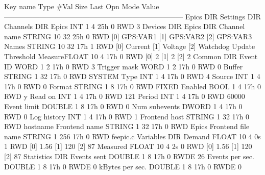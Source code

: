 \begin{DoxyCode}
Key name                        Type    #Val  Size  Last Opn Mode Value
---------------------------------------------------------------------------
Epics                           DIR
    Settings                    DIR
        Channels                DIR
            Epics               INT     1     4     25h  0   RWD  3
        Devices                 DIR
            Epics               DIR
                Channel name    STRING  10    32    25h  0   RWD  
                                        [0]             GPS:VAR1
                                        [1]             GPS:VAR2
                                        [2]             GPS:VAR3
        Names                   STRING  10    32    17h  1   RWD  
                                        [0]             Current
                                        [1]             Voltage
                                        [2]             Watchdog
        Update Threshold MeasureFLOAT   10    4     17h  0   RWD  
                                        [0]             2
                                        [1]             2
                                        [2]             2
    Common                      DIR
        Event ID                WORD    1     2     17h  0   RWD  3
        Trigger mask            WORD    1     2     17h  0   RWD  0
        Buffer                  STRING  1     32    17h  0   RWD  SYSTEM
        Type                    INT     1     4     17h  0   RWD  4
        Source                  INT     1     4     17h  0   RWD  0
        Format                  STRING  1     8     17h  0   RWD  FIXED
        Enabled                 BOOL    1     4     17h  0   RWD  y
        Read on                 INT     1     4     17h  0   RWD  121
        Period                  INT     1     4     17h  0   RWD  60000
        Event limit             DOUBLE  1     8     17h  0   RWD  0
        Num subevents           DWORD   1     4     17h  0   RWD  0
        Log history             INT     1     4     17h  0   RWD  1
        Frontend host           STRING  1     32    17h  0   RWD  hostname
        Frontend name           STRING  1     32    17h  0   RWD  Epics
        Frontend file name      STRING  1     256   17h  0   RWD  feepic.c
    Variables                   DIR
        Demand                  FLOAT   10    4     0s   1   RWD  
                                        [0]             1.56
                                        [1]             120
                                        [2]             87
        Measured                FLOAT   10    4     2s   0   RWD  
                                        [0]             1.56
                                        [1]             120
                                        [2]             87
    Statistics                  DIR
        Events sent             DOUBLE  1     8     17h  0   RWDE 26
        Events per sec.         DOUBLE  1     8     17h  0   RWDE 0
        kBytes per sec.         DOUBLE  1     8     17h  0   RWDE 0
\end{DoxyCode}


